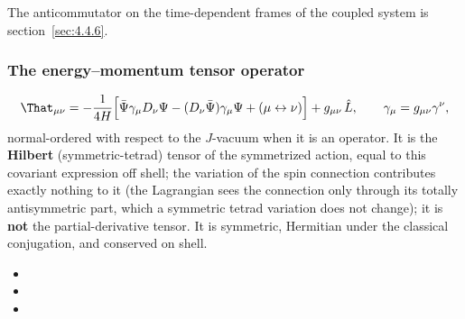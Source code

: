 The anticommutator on the time-dependent frames of the coupled system is section~\ref{sec:4.4.6}.

\subsubsection{The energy--momentum tensor operator}
\label{sec:4.1.5}

\[
  \That_{\mu\nu}=-\frac{1}{4H}\Bigl[\bar\Psi\gamma_\mu D_\nu\Psi-(D_\nu\bar\Psi)\gamma_\mu\Psi+(\mu\leftrightarrow\nu)\Bigr]
  +g_{\mu\nu}\,\hat L,\qquad \gamma_\mu=g_{\mu\nu}\gamma^\nu ,
\]
normal-ordered with respect to the $J$-vacuum when it is an operator. It is the \textbf{Hilbert}
(symmetric-tetrad) tensor of the symmetrized action, equal to this covariant expression off shell; the
variation of the spin connection contributes exactly nothing to it (the Lagrangian sees the connection
only through its totally antisymmetric part, which a symmetric tetrad variation does not change); it is
\textbf{not} the partial-derivative tensor. It is symmetric, Hermitian under the classical conjugation,
and conserved on shell. 
\begin{itemize}
  \item {}
  \item {}
  \item {}
\end{itemize}

